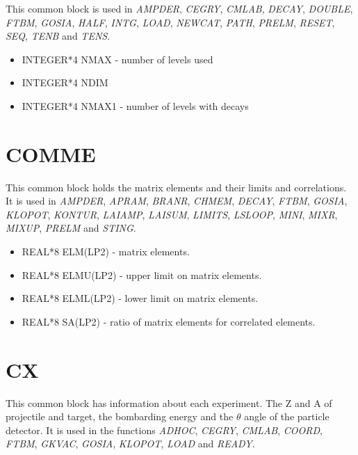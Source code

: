 This common block is used in \emph{AMPDER}, \emph{CEGRY}, \emph{CMLAB}, \emph{
DECAY}, \emph{DOUBLE}, \emph{FTBM}, \emph{GOSIA}, \emph{HALF}, \emph{INTG}, \emph{
LOAD}, \emph{NEWCAT}, \emph{PATH}, \emph{PRELM}, \emph{RESET}, \emph{SEQ}, \emph{
TENB} and \emph{TENS}.

\begin{itemize}
\item INTEGER*4 NMAX - number of levels used
\item INTEGER*4 NDIM
\item INTEGER*4 NMAX1 - number of levels with decays
\end{itemize}

\section{COMME}

This common block holds the matrix elements and their limits and
correlations. It is used in \emph{AMPDER}, \emph{APRAM}, \emph{BRANR}, \emph{
CHMEM}, \emph{DECAY}, \emph{FTBM}, \emph{GOSIA}, \emph{KLOPOT}, \emph{KONTUR},
\emph{LAIAMP}, \emph{LAISUM}, \emph{LIMITS}, \emph{LSLOOP}, \emph{MINI}, \emph{
MIXR}, \emph{MIXUP}, \emph{PRELM} and \emph{STING}.

\begin{itemize}
\item REAL*8 ELM(LP2) - matrix elements.
\item REAL*8 ELMU(LP2) - upper limit on matrix elements.
\item REAL*8 ELML(LP2) - lower limit on matrix elements.
\item REAL*8 SA(LP2) - ratio of matrix elements for correlated elements.
\end{itemize}

\section{CX}

This common block has information about each experiment. The Z and A of
projectile and target, the bombarding energy and the $\theta$ angle of the
particle detector. It is used in the functions \emph{ADHOC}, \emph{CEGRY},
\emph{CMLAB}, \emph{COORD}, \emph{FTBM}, \emph{GKVAC}, \emph{GOSIA}, \emph{
KLOPOT}, \emph{LOAD} and \emph{READY}.

